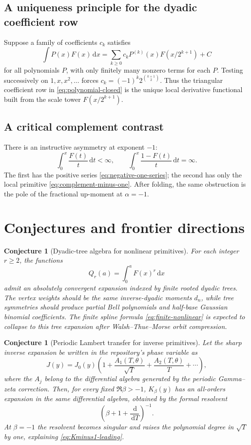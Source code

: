 \documentclass[11pt,oneside]{article}
\numberwithin{equation}{section}
\newtheorem{conjecture}[theorem]{Conjecture}
\theoremstyle{definition}
\theoremstyle{remark}
\newcommand{\InvF}{J}
\newcommand{\dd}{\,\mathrm d}
\begin{document}
\subsection{A uniqueness principle for the dyadic coefficient row}
Suppose a family of coefficients $c_k$ satisfies
\[
 \int P(x)F(x)\dd x=\sum_{k\ge0}c_kP^{(k)}(x)F(x/2^{k+1})+C
\]
for all polynomials $P$, with only finitely many nonzero terms for each $P$.
Testing successively on $1,x,x^2,\ldots$ forces
$c_k=(-1)^k2^{\binom{k+1}{2}}$.  Thus the triangular coefficient row in
\eqref{eq:polynomial-closed} is the unique local derivative functional built
from the scale tower $F(x/2^{k+1})$.

\subsection{A critical complement contrast}
There is an instructive asymmetry at exponent $-1$:
\begin{equation}
 \int_0^x\frac{F(t)}t\dd t<\infty,
 \qquad
 \int_0^x\frac{1-F(t)}t\dd t=\infty.                      \label{eq:critical-contrast}
\end{equation}
The first has the positive series \eqref{eq:negative-one-series}; the second
has only the local primitive \eqref{eq:complement-minus-one}.  After folding,
the same obstruction is the pole of the fractional up-moment at
$\alpha=-1$.

\section{Conjectures and frontier directions}
\label{sec:conjectures}

\begin{conjecture}[Dyadic-tree algebra for nonlinear primitives]
\label{conj:nonlinear-tree}
For each integer $r\ge2$, the functions
\[
 Q_r(a)=\int_0^aF(x)^r\dd x
\]
admit an absolutely convergent expansion indexed by finite rooted dyadic trees.
The vertex weights should be the same inverse-dyadic moments $d_n$, while tree
symmetries should produce partial Bell polynomials and half-base Gaussian
binomial coefficients.  The finite spline formula
\eqref{eq:finite-nonlinear} is expected to collapse to this tree expansion
after Walsh--Thue--Morse orbit compression.
\end{conjecture}

\begin{conjecture}[Periodic Lambert transfer for inverse primitives]
\label{conj:periodic-transfer}
Let the sharp inverse expansion be written in the repository's phase variable as
\[
 \InvF(y)=\InvF_0(y)\left(1+\frac{A_1(T,\theta)}{\sqrt T}
 +\frac{A_2(T,\theta)}T+\cdots\right),
\]
where the $A_j$ belong to the differential algebra generated by the periodic
Gamma--zeta correction.  Then, for every fixed $\Re\beta>-1$, $K_\beta(y)$ has
an all-orders expansion in the same differential algebra, obtained by the
formal resolvent
\[
 \left(\beta+1+\frac{\dd}{\dd T}\right)^{-1}.
\]
At $\beta=-1$ the resolvent becomes singular and raises the polynomial degree in
$\sqrt T$ by one, explaining \eqref{eq:Kminus1-leading}.
\end{conjecture}
\end{document}
